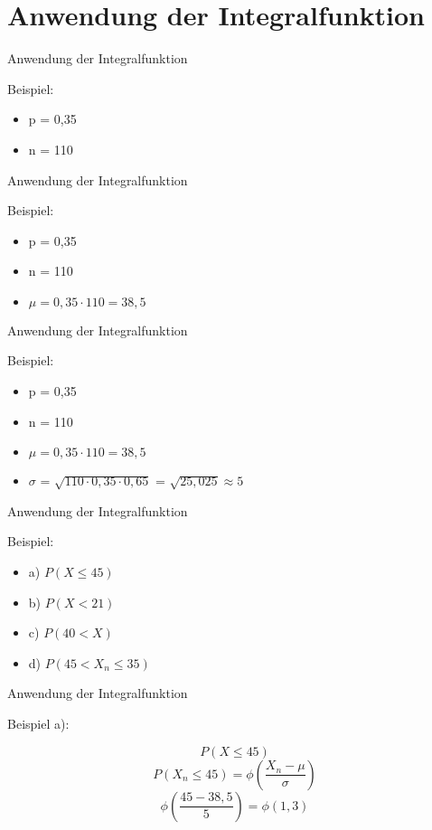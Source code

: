 \documentclass[14pt]{beamer}
\begin{document}
\section{Anwendung der Integralfunktion}
\begin{frame} {Anwendung der Integralfunktion}

Beispiel:
\begin{itemize}
 \item p = 0,35
 \item n = 110
\end{itemize}

\end{frame}

\begin{frame} {Anwendung der Integralfunktion}

Beispiel:
\begin{itemize}
 \item p = 0,35
 \item n = 110
 \item $\mu = 0,35 \cdot 110 = 38,5 $
\end{itemize}

\end{frame}

\begin{frame} {Anwendung der Integralfunktion}

Beispiel:
\begin{itemize}
 \item p = 0,35
 \item n = 110
 \item $\mu = 0,35 \cdot 110 = 38,5 $
 \item $\sigma$ = $\sqrt{110 \cdot 0,35 \cdot 0,65}$ = $\sqrt{25,025} \approx 5$ 
\end{itemize}

\end{frame}

\begin{frame} {Anwendung der Integralfunktion}

Beispiel:
\begin{itemize}
 \item a) $P(X \le 45)$
 \item b) $P(X < 21)$
 \item c) $P(40 < X)$
 \item d) $P(45 < X_n \le 35)$
\end{itemize}

\end{frame}

\begin{frame} {Anwendung der Integralfunktion}

Beispiel a):
 
 $$P(X\le45)$$
 $$P(X_n \le 45) =  \phi\left(\frac{X_n - \mu}{\sigma}\right)$$
 $$ \phi(\frac{45 - 38,5}{5}) = \phi(1,3) $$

\end{frame}
\end{document}
